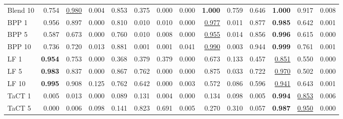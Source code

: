 \begin{table}[htbp]
\begin{adjustbox}{max width=\linewidth}
\begin{tabular}{lrrrrrrrrrrrrr}
Blend 10 & 0.754 & \underline{0.980} & \textcolor{black!45}{0.004} & 0.853 & \textcolor{black!45}{0.375} & \textcolor{black!45}{0.000} & \textcolor{black!45}{0.000} & \textbf{1.000} & 0.759 & 0.646 & \textbf{1.000} & 0.917 & \textcolor{black!45}{0.008} \\
BPP 1 & 0.956 & 0.897 & \textcolor{black!45}{0.000} & 0.810 & \textcolor{black!45}{0.010} & \textcolor{black!45}{0.010} & \textcolor{black!45}{0.000} & \underline{0.977} & \textcolor{black!45}{0.011} & 0.877 & \textbf{0.985} & 0.642 & \textcolor{black!45}{0.001} \\
BPP 5 & 0.587 & 0.673 & \textcolor{black!45}{0.000} & 0.760 & \textcolor{black!45}{0.010} & \textcolor{black!45}{0.008} & \textcolor{black!45}{0.000} & \underline{0.955} & \textcolor{black!45}{0.014} & 0.856 & \textbf{0.996} & 0.615 & \textcolor{black!45}{0.000} \\
BPP 10 & 0.736 & 0.720 & \textcolor{black!45}{0.013} & 0.881 & \textcolor{black!45}{0.001} & \textcolor{black!45}{0.001} & \textcolor{black!45}{0.041} & \underline{0.990} & \textcolor{black!45}{0.003} & 0.944 & \textbf{0.999} & 0.761 & \textcolor{black!45}{0.001} \\
LF 1 & \textbf{0.954} & 0.753 & \textcolor{black!45}{0.000} & \textcolor{black!45}{0.368} & \textcolor{black!45}{0.379} & \textcolor{black!45}{0.379} & \textcolor{black!45}{0.000} & 0.673 & \textcolor{black!45}{0.133} & \textcolor{black!45}{0.457} & \underline{0.851} & 0.550 & \textcolor{black!45}{0.000} \\
LF 5 & \textbf{0.983} & 0.837 & \textcolor{black!45}{0.000} & 0.867 & 0.762 & \textcolor{black!45}{0.000} & \textcolor{black!45}{0.000} & 0.875 & \textcolor{black!45}{0.033} & 0.722 & \underline{0.970} & 0.502 & \textcolor{black!45}{0.000} \\
LF 10 & \textbf{0.995} & 0.908 & \textcolor{black!45}{0.125} & 0.762 & 0.642 & \textcolor{black!45}{0.000} & \textcolor{black!45}{0.003} & 0.572 & \textcolor{black!45}{0.086} & 0.596 & \underline{0.941} & 0.643 & \textcolor{black!45}{0.001} \\
TaCT 1 & \textcolor{black!45}{0.005} & \textcolor{black!45}{0.013} & \textcolor{black!45}{0.000} & \textcolor{black!45}{0.089} & \textcolor{black!45}{0.131} & \textcolor{black!45}{0.004} & \textcolor{black!45}{0.000} & \textcolor{black!45}{0.134} & \textcolor{black!45}{0.098} & \textcolor{black!45}{0.005} & \textbf{0.994} & \underline{0.853} & \textcolor{black!45}{0.006} \\
TaCT 5 & \textcolor{black!45}{0.000} & \textcolor{black!45}{0.006} & \textcolor{black!45}{0.098} & \textcolor{black!45}{0.141} & 0.823 & 0.691 & \textcolor{black!45}{0.005} & \textcolor{black!45}{0.270} & \textcolor{black!45}{0.310} & \textcolor{black!45}{0.057} & \textbf{0.987} & \underline{0.950} & \textcolor{black!45}{0.000} \\

\end{tabular}
\end{adjustbox}
\end{table}
